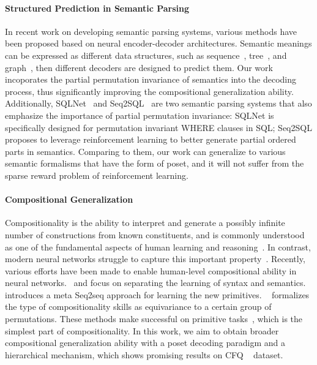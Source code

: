 \documentclass{article}
\begin{document}
\paragraph{Structured Prediction in Semantic Parsing}
In recent work on developing semantic parsing systems, various methods have been proposed based on neural encoder-decoder architectures.
Semantic meanings can be expressed as different data structures, such as sequence~\citep{sutskever2014sequence,bahdanau2014neural}, tree~\citep{dong-lapata-2016-language,polosukhin2018neural}, and graph~\citep{buys2017robust,damonte2017incremental,lyu2018amr,fancellu2019semantic}, then different decoders are designed to predict them.
Our work incoporates the partial permutation invariance of semantics into the decoding process, thus significantly improving the compositional generalization ability.
Additionally, SQLNet~\citep{xu2017sqlnet} and Seq2SQL~\citep{zhong2017seq2sql} are two semantic parsing systems that also emphasize the importance of partial permutation invariance:
SQLNet is specifically designed for permutation invariant WHERE clauses in SQL;
Seq2SQL proposes to leverage reinforcement learning to better generate partial ordered parts in semantics.
Comparing to them, our work can generalize to various semantic formalisms that have the form of poset, and it will not suffer from the sparse reward problem of reinforcement learning.



\paragraph{Compositional Generalization} 
Compositionality is the ability to interpret and generate a possibly infinite number of constructions
from known constituents, and is commonly understood as one of the fundamental aspects of human
learning and reasoning~\citep{chomsky1965aspects,minsky1988society}. In contrast, modern neural networks struggle to capture this important property~\citep{lake2018generalization,loula2018rearranging}. 
Recently, various efforts have been made to enable human-level compositional ability in neural networks.~\citet{russin2019compositional} and \citet{li2019compositional} focus on separating the learning of syntax and semantics. ~\citet{lake2018generalization} introduces a meta Seq2seq approach for learning the new primitives. ~\citet{gordon2020permutation} formalizes the type of compositionality skills as equivariance to a certain group of permutations. These methods make successful on primitive tasks~\citep{lake2018generalization}, which is the simplest part of compositionality. In this work, we aim to obtain broader compositional generalization ability with a poset decoding paradigm and a hierarchical mechanism, which shows promising results on CFQ ~\citep{keysers2020measuring} dataset.
\end{document}
